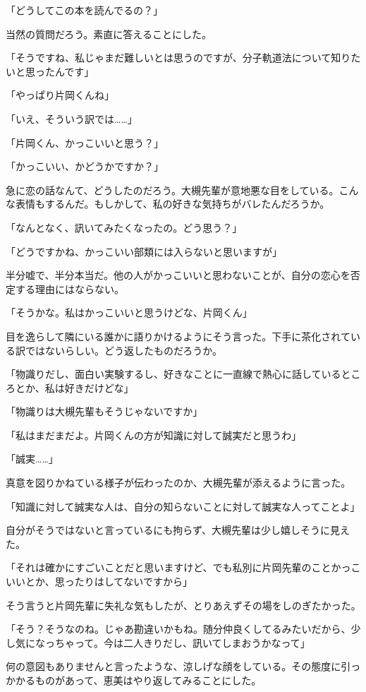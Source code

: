 \documentclass[a4paper,dvipdfmx,12pt]{jsarticle}
\begin{document}
「どうしてこの本を読んでるの？」

当然の質問だろう。素直に答えることにした。

「そうですね、私じゃまだ難しいとは思うのですが、分子軌道法について知りたいと思ったんです」

「やっぱり片岡くんね」

「いえ、そういう訳では……」

「片岡くん、かっこいいと思う？」


「かっこいい、かどうかですか？」

急に恋の話なんて、どうしたのだろう。大槻先輩が意地悪な目をしている。こんな表情もするんだ。もしかして、私の好きな気持ちがバレたんだろうか。

「なんとなく、訊いてみたくなったの。どう思う？」

「どうですかね、かっこいい部類には入らないと思いますが」

半分嘘で、半分本当だ。他の人がかっこいいと思わないことが、自分の恋心を否定する理由にはならない。

「そうかな。私はかっこいいと思うけどな、片岡くん」

目を逸らして隣にいる誰かに語りかけるようにそう言った。下手に茶化されている訳ではないらしい。どう返したものだろうか。

「物識りだし、面白い実験するし、好きなことに一直線で熱心に話しているところとか、私は好きだけどな」

「物識りは大槻先輩もそうじゃないですか」

「私はまだまだよ。片岡くんの方が知識に対して誠実だと思うわ」

「誠実……」

真意を図りかねている様子が伝わったのか、大槻先輩が添えるように言った。

「知識に対して誠実な人は、自分の知らないことに対して誠実な人ってことよ」

自分がそうではないと言っているにも拘らず、大槻先輩は少し嬉しそうに見えた。

「それは確かにすごいことだと思いますけど、でも私別に片岡先輩のことかっこいいとか、思ったりはしてないですから」

そう言うと片岡先輩に失礼な気もしたが、とりあえずその場をしのぎたかった。

「そう？そうなのね。じゃあ勘違いかもね。随分仲良くしてるみたいだから、少し気になっちゃって。今は二人きりだし、訊いてしまおうかなって」

何の意図もありませんと言ったような、涼しげな顔をしている。その態度に引っかかるものがあって、恵美はやり返してみることにした。
\end{document}
